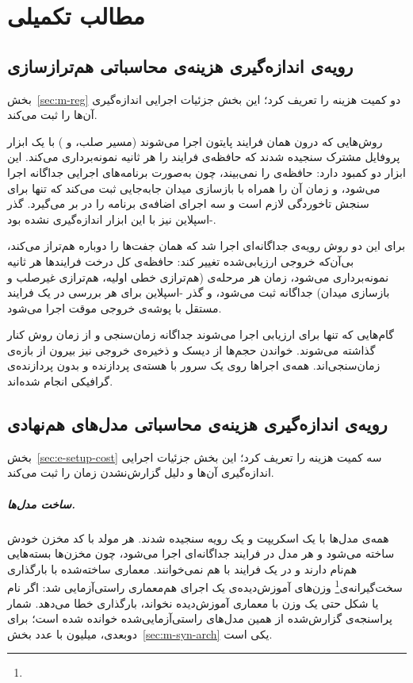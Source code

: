
\chapter{مطالب تکمیلی}
\label{chap:appendix}

\section{رویه‌ی اندازه‌گیری هزینه‌ی محاسباتی هم‌ترازسازی}
\label{sec:app-cost}

بخش~\ref{sec:m-reg} دو کمیت هزینه را تعریف کرد؛ این بخش جزئیات اجرایی اندازه‌گیری آن‌ها را ثبت می‌کند.

روش‌هایی که درون همان فرایند پایتون اجرا می‌شوند (مسیر صلب،  و ) با یک ابزار پروفایل مشترک سنجیده شدند که حافظه‌ی فرایند را هر  ثانیه نمونه‌برداری می‌کند. این ابزار دو کمبود دارد: حافظه‌ی  را نمی‌بیند، چون  به‌صورت برنامه‌های اجرایی جداگانه اجرا می‌شود، و زمان آن را همراه با بازسازی میدان جابه‌جایی ثبت می‌کند که تنها برای سنجش تاخوردگی لازم است و سه اجرای اضافه‌ی برنامه را در بر می‌گیرد. گذر -اسپلاین نیز با این ابزار اندازه‌گیری نشده بود.

برای این دو روش رویه‌ی جداگانه‌ای اجرا شد که همان جفت‌ها را دوباره هم‌تراز می‌کند، بی‌آن‌که خروجی ارزیابی‌شده تغییر کند: حافظه‌ی کل درخت فرایندها هر  ثانیه نمونه‌برداری می‌شود، زمان هر مرحله‌ی  (هم‌ترازی خطی اولیه، هم‌ترازی غیرصلب و بازسازی میدان) جداگانه ثبت می‌شود، و گذر -اسپلاین برای هر بررسی در یک فرایند مستقل با پوشه‌ی خروجی موقت اجرا می‌شود.

گام‌هایی که تنها برای ارزیابی اجرا می‌شوند جداگانه زمان‌سنجی و از زمان روش کنار گذاشته می‌شوند. خواندن حجم‌ها از دیسک و ذخیره‌ی خروجی نیز بیرون از بازه‌ی زمان‌سنجی‌اند. همه‌ی اجراها روی یک سرور با  هسته‌ی پردازنده و بدون پردازنده‌ی گرافیکی انجام شده‌اند.

\section{رویه‌ی اندازه‌گیری هزینه‌ی محاسباتی مدل‌های هم‌نهادی}
\label{sec:app-cost-syn}

بخش~\ref{sec:e-setup-cost} سه کمیت هزینه را تعریف کرد؛ این بخش جزئیات اجرایی اندازه‌گیری آن‌ها و دلیل گزارش‌نشدن زمان را ثبت می‌کند.

\paragraph{ساخت مدل‌ها.} همه‌ی مدل‌ها با یک اسکریپت و یک رویه سنجیده شدند. هر مولد با کد مخزن خودش ساخته می‌شود و هر مدل در فرایند جداگانه‌ای اجرا می‌شود، چون مخزن‌ها بسته‌هایی هم‌نام دارند و در یک فرایند با هم نمی‌خوانند. معماری ساخته‌شده با بارگذاری سخت‌گیرانه‌ی\footnote{} وزن‌های آموزش‌دیده‌ی یک اجرای هم‌معماری راستی‌آزمایی شد: اگر نام یا شکل حتی یک وزن با معماری آموزش‌دیده نخواند، بارگذاری خطا می‌دهد. شمار پراسنجه‌ی گزارش‌شده از همین مدل‌های راستی‌آزمایی‌شده خوانده شده است؛ برای  دوبعدی،  میلیون با عدد بخش~\ref{sec:m-syn-arch} یکی است.

